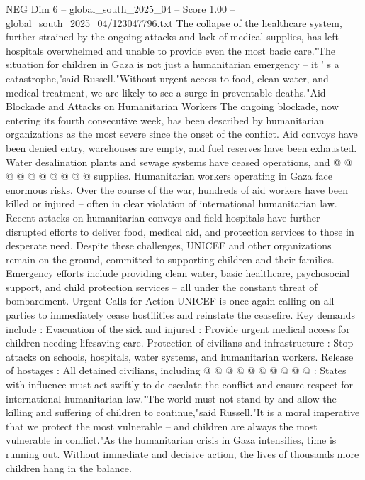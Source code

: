 \begin{textsample}{NEG Dim 6 – global\_south\_2025\_04 – Score 1.00 – global\_south\_2025\_04/123047796.txt}
The collapse of the healthcare system, further strained by the ongoing attacks and lack of medical supplies, has left hospitals overwhelmed and unable to provide even the most basic care."The situation for children in Gaza is not just a humanitarian emergency -- it ' s a catastrophe,"said Russell."Without urgent access to food, clean water, and medical treatment, we are likely to see a surge in preventable deaths."Aid Blockade and Attacks on Humanitarian Workers The ongoing blockade, now entering its fourth consecutive week, has been described by humanitarian organizations as the most severe since the onset of the conflict.
Aid convoys have been denied entry, warehouses are empty, and fuel reserves have been exhausted.
Water desalination plants and sewage systems have ceased operations, and @ @ @ @ @ @ @ @ @ @ supplies.
Humanitarian workers operating in Gaza face enormous risks.
Over the course of the war, hundreds of aid workers have been killed or injured -- often in clear violation of international humanitarian law.
Recent attacks on humanitarian convoys and field hospitals have further disrupted efforts to deliver food, medical aid, and protection services to those in desperate need.
Despite these challenges, UNICEF and other organizations remain on the ground, committed to supporting children and their families.
Emergency efforts include providing clean water, basic healthcare, psychosocial support, and child protection services -- all under the constant threat of bombardment.
Urgent Calls for Action UNICEF is once again calling on all parties to immediately cease hostilities and reinstate the ceasefire.
Key demands include : Evacuation of the sick and injured : Provide urgent medical access for children needing lifesaving care.
Protection of civilians and infrastructure : Stop attacks on schools, hospitals, water systems, and humanitarian workers.
Release of hostages : All detained civilians, including @ @ @ @ @ @ @ @ @ @ : States with influence must act swiftly to de-escalate the conflict and ensure respect for international humanitarian law."The world must not stand by and allow the killing and suffering of children to continue,"said Russell."It is a moral imperative that we protect the most vulnerable -- and children are always the most vulnerable in conflict."As the humanitarian crisis in Gaza intensifies, time is running out.
Without immediate and decisive action, the lives of thousands more children hang in the balance.

\end{textsample}
